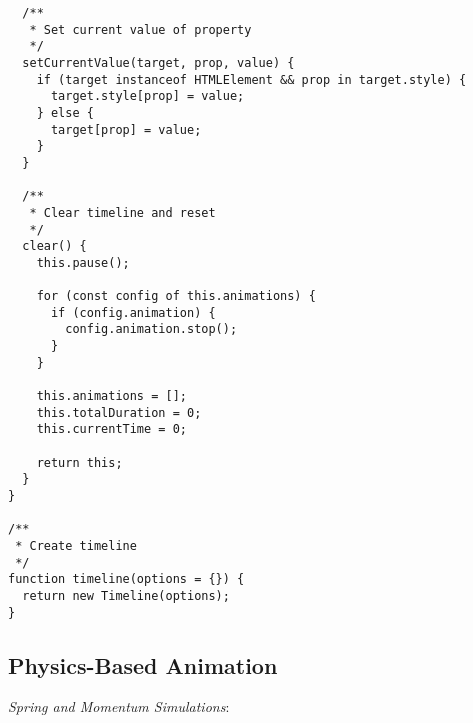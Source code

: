 \documentclass[11pt]{article}
\begin{document}
\begin{verbatim}
  /**
   * Set current value of property
   */
  setCurrentValue(target, prop, value) {
    if (target instanceof HTMLElement && prop in target.style) {
      target.style[prop] = value;
    } else {
      target[prop] = value;
    }
  }
  
  /**
   * Clear timeline and reset
   */
  clear() {
    this.pause();
    
    for (const config of this.animations) {
      if (config.animation) {
        config.animation.stop();
      }
    }
    
    this.animations = [];
    this.totalDuration = 0;
    this.currentTime = 0;
    
    return this;
  }
}

/**
 * Create timeline
 */
function timeline(options = {}) {
  return new Timeline(options);
}
\end{verbatim}
\subsection{Physics-Based Animation}
\label{sec:org8d92048}

\emph{Spring and Momentum Simulations}:
\end{document}
